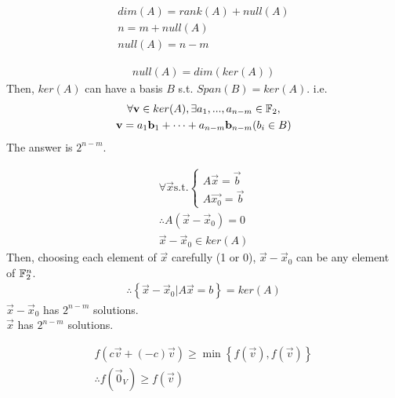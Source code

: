 \documentclass[1]{mathtoolkit}
\begin{document}
\begin{p}
  \item
    \begin{subp}
      \item
        \begin{gather}
          dim(A) = rank(A) + null(A) \\
          n = m + null(A) \\
          null(A) = n - m
        \end{gather}
      \item
        \begin{gather}
          null(A) = dim(ker(A))
        \end{gather}
        Then, $ker(A)$ can have a basis $B$ s.t. $Span(B) = ker(A)$.
        i.e.
        \begin{gather}
          \forall \mathbf{v} \in ker(A),
          \exists a_1, ..., a_{n-m} \in \mathbb{F}_2, \\
          \mathbf{v} = a_1 \mathbf{b}_1 + \dots + a_{n-m} \mathbf{b}_{n-m} (b_i \in B)
        \end{gather}
        \therefore The answer is $2^{n-m}$.
      \item
        \begin{gather}
          \forall \vec{x}
          \text{s.t.}
          \begin{cases}
            A \vec{x} = \vec{b} \\
            A \vec{x_0} = \vec{b}
          \end{cases} \\
          \therefore A (\vec{x} - \vec{x}_0) = 0 \\
          \vec{x} - \vec{x}_0 \in ker(A)
        \end{gather}
        Then, choosing each element of $\vec{x}$ carefully (1 or 0),
        $\vec{x} - \vec{x}_0$ can be any element of $\mathbb{F}^n_2$.
        \begin{gather}
          \therefore \left\{ \vec{x} - \vec{x}_0 | A \vec{x} = b \right\} = ker(A)
        \end{gather}
        \therefore $\vec{x} - \vec{x}_0$ has $2^{n-m}$ solutions. \\
        \therefore $\vec{x}$ has $2^{n-m}$ solutions. \\
    \end{subp}

  \item
    \begin{subp}
      \begin{gather}
        f(c \vec{v} + (-c) \vec{v}) \ge \min \left\{ f(\vec{v}), f(\vec{v}) \right\} \\
        \therefore f(\vec{0}_V) \ge f(\vec{v})
      \end{gather}
    \end{subp}
\end{p}
\end{document}
